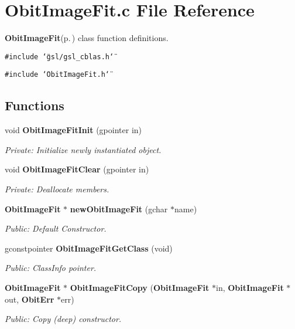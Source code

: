 \section{Obit\-Image\-Fit.c File Reference}
\label{ObitImageFit_8c}
{\bf Obit\-Image\-Fit}{\rm (p.\,\pageref{structObitImageFit})} class function definitions. 

{\tt \#include \char`\"{}gsl/gsl\_\-cblas.h\char`\"{}}\par
{\tt \#include \char`\"{}Obit\-Image\-Fit.h\char`\"{}}\par
\subsection*{Functions}
\begin{CompactItemize}
\item 
void {\bf Obit\-Image\-Fit\-Init} (gpointer in)
\begin{CompactList}\small\item\em Private: Initialize newly instantiated object. \item\end{CompactList}\item 
void {\bf Obit\-Image\-Fit\-Clear} (gpointer in)
\begin{CompactList}\small\item\em Private: Deallocate members. \item\end{CompactList}\item 
{\bf Obit\-Image\-Fit} $\ast$ {\bf new\-Obit\-Image\-Fit} (gchar $\ast$name)
\begin{CompactList}\small\item\em Public: Default Constructor. \item\end{CompactList}\item 
gconstpointer {\bf Obit\-Image\-Fit\-Get\-Class} (void)
\begin{CompactList}\small\item\em Public: Class\-Info pointer. \item\end{CompactList}\item 
{\bf Obit\-Image\-Fit} $\ast$ {\bf Obit\-Image\-Fit\-Copy} ({\bf Obit\-Image\-Fit} $\ast$in, {\bf Obit\-Image\-Fit} $\ast$out, {\bf Obit\-Err} $\ast$err)
\begin{CompactList}\small\item\em Public: Copy (deep) constructor. \item\end{CompactList}\item 

\end{CompactItemize}
